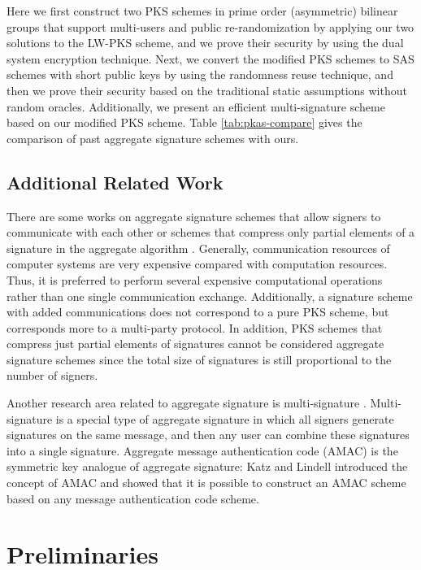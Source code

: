 \documentclass[11pt,letterpaper]{article}
\begin{document}
Here we first construct two PKS schemes in prime order (asymmetric) bilinear
groups that support multi-users and public re-randomization by applying our
two solutions to the LW-PKS scheme, and we prove their security by using the
dual system encryption technique. Next, we convert the modified PKS schemes
to SAS schemes with short public keys by using the randomness reuse
technique, and then we prove their security based on the traditional static
assumptions without random oracles. Additionally, we present an efficient
multi-signature scheme based on our modified PKS scheme. Table
\ref{tab:pkas-compare} gives the comparison of past aggregate signature
schemes with ours.

\subsection{Additional Related Work}

There are some works on aggregate signature schemes that allow signers to
communicate with each other or schemes that compress only partial elements of
a signature in the aggregate algorithm \cite{BellareN07,BagherzandiJ10,
Herranz06,BrogleGR12}. Generally, communication resources of computer systems
are very expensive compared with computation resources. Thus, it is preferred
to perform several expensive computational operations rather than one single
communication exchange. Additionally, a signature scheme with added
communications does not correspond to a pure PKS scheme, but corresponds more
to a multi-party protocol. In addition, PKS schemes that compress just
partial elements of signatures cannot be considered aggregate signature
schemes since the total size of signatures is still proportional to the
number of signers.

Another research area related to aggregate signature is multi-signature
\cite{ItakuraN83,Boldyreva03,LuOSSW06}. Multi-signature is a special type of
aggregate signature in which all signers generate signatures on the same
message, and then any user can combine these signatures into a single
signature. Aggregate message authentication code (AMAC) is the symmetric key
analogue of aggregate signature: Katz and Lindell \cite{KatzL08} introduced
the concept of AMAC and showed that it is possible to construct an AMAC
scheme based on any message authentication code scheme.

\section{Preliminaries}
\end{document}
